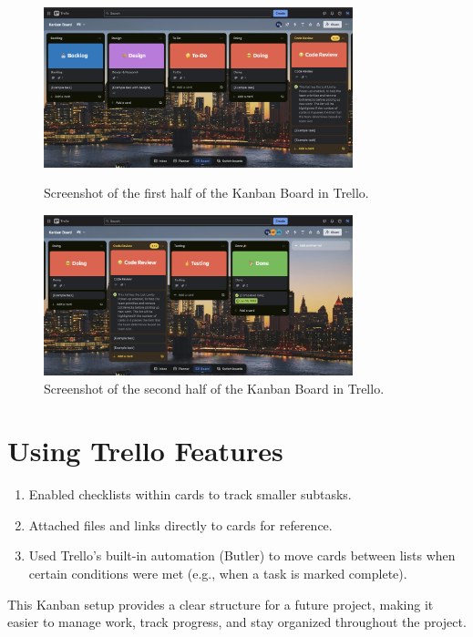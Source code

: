 \begin{figure}[h!]
    \centering
    \includegraphics[width=0.8\textwidth]{kanban_board.png}
    \caption{Screenshot of the first half of the Kanban Board in Trello.}
    \label{fig:kanban_board}
    
    \vspace{0.5cm} %
    
    \includegraphics[width=0.8\textwidth]{kanban_board2.png}
    \caption{Screenshot of the second half of the Kanban Board in Trello.}
    \label{fig:kanban_board2}
\end{figure}

\section{Using Trello Features}
\begin{enumerate}
    \item Enabled checklists within cards to track smaller subtasks.
    \item Attached files and links directly to cards for reference.
    \item Used Trello’s built-in automation (Butler) to move cards between lists when certain conditions were met (e.g., when a task is marked complete).
\end{enumerate}

This Kanban setup provides a clear structure for a future project, making it easier to manage work, track progress, and stay organized throughout the project.
